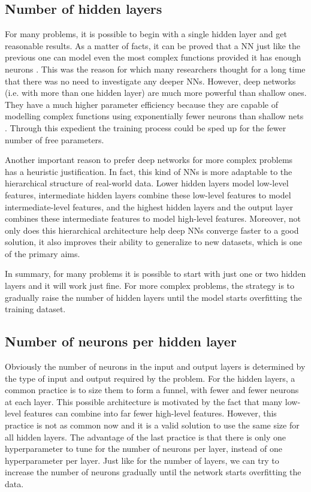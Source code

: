 \subsection{Number of hidden layers}
For many problems, it is possible to begin with a single hidden layer and get reasonable results. As a matter of facts, it can be proved that a NN just like the previous one can model even the most complex functions provided it has enough neurons \cite{hanin}. This was the reason for which many researchers thought for a long time that there was no need to investigate any deeper NNs. However, deep networks (i.e. with more than one hidden layer) are much more powerful than shallow ones. They have a much higher parameter efficiency because they are capable of modelling complex functions using exponentially fewer neurons than shallow nets \cite{oreilly}. Through this expedient the training process could be sped up for the fewer number of free parameters.

Another important reason to prefer deep networks for more complex problems has a heuristic justification. In fact, this kind of NNs is more adaptable to the hierarchical structure of real-world data. Lower hidden layers model low-level features, intermediate hidden layers combine these low-level features to model intermediate-level features, and the highest hidden layers and the output layer combines these intermediate features to model high-level features. Moreover, not only does this hierarchical architecture help deep NNs converge faster to a good solution, it also improves their ability to generalize to new datasets, which is one of the primary aims.

In summary, for many problems it is possible to start with just one or two hidden layers and it will work just fine. For more complex problems, the strategy is to gradually raise the number of hidden layers until the model starts overfitting the training dataset.



\subsection{Number of neurons per hidden layer}
Obviously the number of neurons in the input and output layers is determined by the type of input and output required by the problem. For the hidden layers, a common practice is to size them to form a funnel, with fewer and fewer neurons at each layer. This possible architecture is motivated by the fact that many low-level features can combine into far fewer high-level features. However, this practice is not as common now and it is a valid solution to use the same size for all hidden layers. The advantage of the last practice is that there is only one hyperparameter to tune for the number of neurons per layer, instead of one hyperparameter per layer. Just like for the number of layers, we can try to increase the number of neurons gradually until the network starts overfitting the data.

